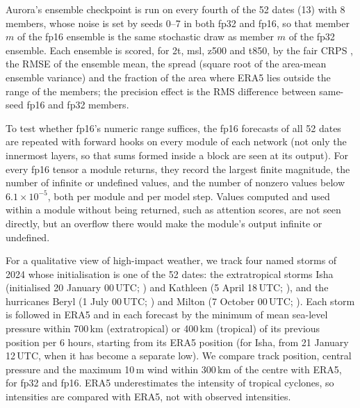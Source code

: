 Aurora's ensemble checkpoint is run on every fourth of the 52
dates (13) with 8 members, whose noise is set by seeds 0--7 in both fp32
and fp16, so that member $m$ of the fp16 ensemble is the same stochastic
draw as member $m$ of the fp32 ensemble. Each ensemble is scored, for
2t, msl, z500 and t850, by the
fair CRPS \citep{ferro2014fair}, the RMSE of the ensemble mean, the spread
(square root of the area-mean ensemble variance) and the fraction of the
area where ERA5 lies outside the range of the members; the precision effect
is the RMS difference between same-seed fp16 and fp32 members.

To test whether fp16's numeric range suffices, the fp16 forecasts of
all 52 dates are repeated with forward hooks on every module of each
network (not only the innermost layers, so that sums formed inside a
block are seen at its output). For every fp16 tensor a module returns,
they record the largest finite magnitude, the number of infinite or
undefined values, and the number of nonzero values below
$6.1\times10^{-5}$, both per module and per model step. Values computed
and used within a module without being returned, such as attention
scores, are not seen directly, but an overflow there would make the
module's output infinite or undefined.

For a qualitative view of high-impact weather, we track four named
storms of 2024 whose initialisation is one of the 52 dates: the
extratropical storms Isha (initialised 20 January 00\,UTC;
\citealp{metoffice2024isha}) and Kathleen (5 April 18\,UTC;
\citealp{metoffice2024kathleen}), and the hurricanes Beryl (1 July 00\,UTC;
\citealp{beven2025beryl}) and Milton (7 October 00\,UTC;
\citealp{beven2025milton}). Each storm is followed in ERA5 and in each forecast
by the minimum of mean sea-level pressure within 700\,km (extratropical)
or 400\,km (tropical) of its previous position per 6 hours, starting from
its ERA5 position (for Isha, from 21 January 12\,UTC, when it has become a
separate low). We compare track position, central pressure and the
maximum 10\,m wind within 300\,km of the centre with ERA5, for fp32 and
fp16. ERA5 underestimates the
intensity of tropical cyclones, so intensities are compared with ERA5,
not with observed intensities.


